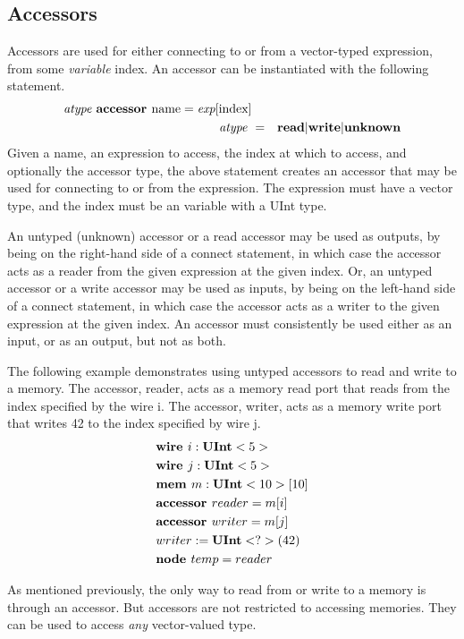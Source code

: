 \documentclass[12pt]{article}
\begin{document}
\subsection{Accessors}
Accessors are used for either connecting to or from a vector-typed expression, from some {\em variable} index.
An accessor can be instantiated with the following statement.
\[
\begin{aligned}
\text{\em atype\ }  \text{\bf accessor\ } \text{name} = \text{\em exp}[\text{index}] \\
\text{\em atype\ }      &=     &\text{\bf read} \vert \text{\bf write} \vert \text{\bf unknown}   \\
\end{aligned}
\]
Given a name, an expression to access, the index at which to access, and optionally the accessor type, the above statement creates an accessor that may be used for connecting to or from the expression.
The expression must have a vector type, and the index must be an variable with a UInt type.

An untyped (unknown) accessor or a read accessor may be used as outputs, by being on the right-hand side of a connect statement, in which case the accessor acts as a reader from the given expression at the given index.
Or, an untyped accessor or a write accessor may be used as inputs, by being on the left-hand side of a connect statement, in which case the accessor acts as a writer to the given expression at the given index.
An accessor must consistently be used either as an input, or as an output, but not as both.

The following example demonstrates using untyped accessors to read and write to a memory.
The accessor, reader, acts as a memory read port that reads from the index specified by the wire i.
The accessor, writer, acts as a memory write port that writes 42 to the index specified by wire j.
\[
\begin{aligned}
&\text{\bf wire\ } i : \text{\bf UInt}<5> \\
&\text{\bf wire\ } j : \text{\bf UInt}<5> \\
&\text{\bf mem\ } m : \text{\bf UInt}<10>[10] \\
&\text{\bf accessor\ } reader = m[i] \\
&\text{\bf accessor\ } writer = m[j] \\
&writer := \text{\bf UInt}<?>(42) \\
&\text{\bf node\ } temp = reader \\
\end{aligned}
\]

As mentioned previously, the only way to read from or write to a memory is through an accessor.
But accessors are not restricted to accessing memories.
They can be used to access {\em any} vector-valued type. 
\end{document}
